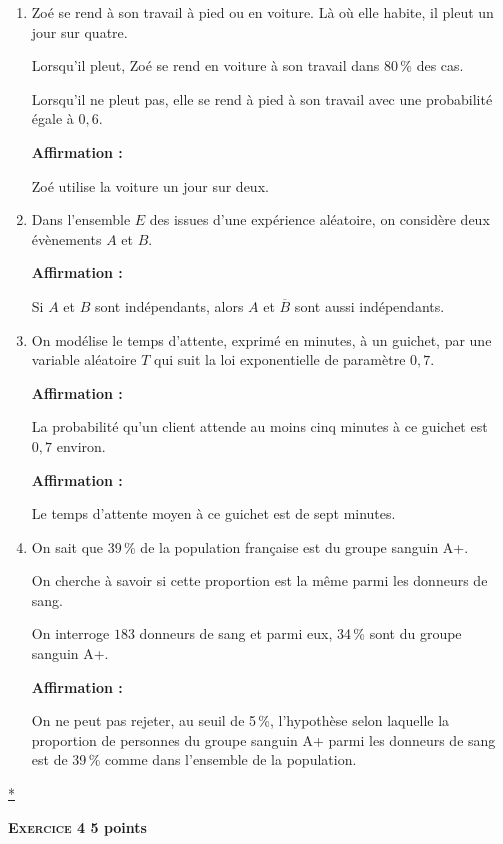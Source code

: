 \documentclass[10pt]{article}
\begin{document}
\begin{enumerate}
\item Zoé se rend à son travail à pied ou en voiture. Là où elle habite, il pleut un jour sur quatre.
 
Lorsqu'il pleut, Zoé se rend en voiture à son travail dans 80\,\% des cas.
 
Lorsqu'il ne pleut pas, elle se rend à pied à son travail avec une probabilité égale à $0,6$.
 
\textbf{Affirmation  :}
 
\og Zoé utilise la voiture un jour sur deux. \fg 
\item Dans l'ensemble $E$ des issues d'une expérience aléatoire, on considère deux évènements $A$ et $B$.
 
\textbf{Affirmation  :}
 
\og Si $A$ et $B$ sont indépendants, alors $A$ et $\overline{B}$ sont aussi indépendants. \fg {}
\item On modélise le temps d'attente, exprimé en minutes, à un guichet, par une variable aléatoire $T$ qui suit la loi exponentielle de paramètre $0,7$.
 
\textbf{Affirmation  :}
 
\og La probabilité qu'un client attende au moins cinq minutes à ce guichet est $0,7$ environ. \fg
 
\textbf{Affirmation  :}
 
\og Le temps d'attente moyen à ce guichet est de sept minutes.\fg 
\item On sait que 39\,\% de la population française est du groupe sanguin A+.
 
On cherche à savoir si cette proportion est la même parmi les donneurs de sang.

On interroge $183$ donneurs de sang et parmi eux, 34\,\% sont du groupe sanguin A+.
 
\textbf{Affirmation  :}
 
\og On ne peut pas rejeter, au seuil de 5\,\%, l'hypothèse selon laquelle la proportion de personnes du groupe sanguin A+ parmi les donneurs de sang est de 39\,\% comme dans l'ensemble de la population. \fg {} 
\end{enumerate}

\hyperlink{Index}{*}
\vspace{0,5cm}

\textbf{\textsc{Exercice 4} \hfill 5 points}
 
\end{document}
